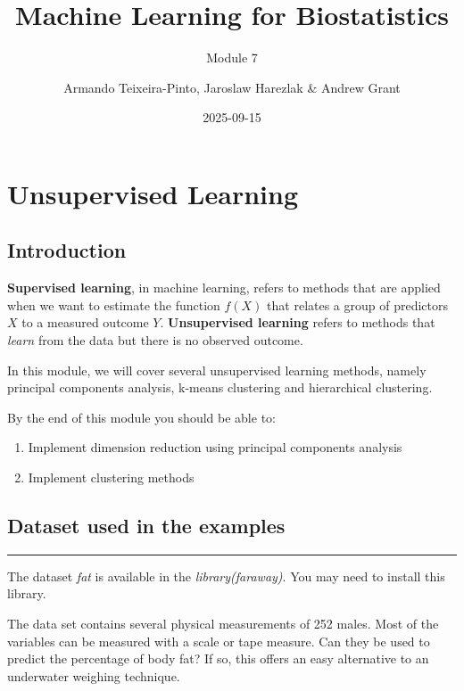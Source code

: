 \documentclass[
]{book}
\title{Machine Learning for Biostatistics}
\subtitle{Module 7}
\author{Armando Teixeira-Pinto, Jaroslaw Harezlak \& Andrew Grant}
\date{2025-09-15}
\providecommand{\tightlist}{%
  \setlength{\itemsep}{0pt}\setlength{\parskip}{0pt}}
\begin{document}
\maketitle

{
\setcounter{tocdepth}{1}
\tableofcontents
}
\chapter*{Unsupervised Learning}\label{unsupervised-learning}

\section*{Introduction}\label{introduction}

\textbf{Supervised learning}, in machine learning, refers to methods that are applied
when we want to estimate the function \(f(X)\)
that relates a group of predictors \(X\) to a measured outcome \(Y\).
\textbf{Unsupervised learning } refers to methods that \emph{learn} from the data but
there is no observed outcome.

In this module, we will cover several unsupervised learning methods, namely
principal components analysis, k-means clustering and hierarchical clustering.

By the end of this module you should be able to:

\begin{enumerate}
\def\labelenumi{\arabic{enumi}.}
\tightlist
\item
  Implement dimension reduction using principal components analysis
\item
  Implement clustering methods
\end{enumerate}

\section*{Dataset used in the examples}\label{dataset-used-in-the-examples}

\begin{center}\rule{0.5\linewidth}{0.5pt}\end{center}

The dataset \emph{fat} is available in the \emph{library(faraway)}. You may need to install
this library.

The data set contains several physical measurements of 252 males.
Most of the variables can be measured with a scale or tape measure.
Can they be used to predict the percentage of body fat? If so,
this offers an easy alternative to an underwater weighing technique.
\end{document}
